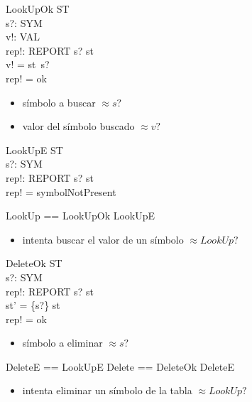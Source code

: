 \begin{schema}{LookUpOk}
\Xi ST \\
s?: SYM \\
v!: VAL \\
rep!: REPORT
\where
s? \in \dom st \\
v! = st~s? \\
rep! = ok
\end{schema}

\begin{itemize}
  \item símbolo a buscar $\approx s?$ \\
  \item valor del símbolo buscado  $\approx v?$ \\
\end{itemize}

\begin{schema}{LookUpE}
\Xi ST \\
s?: SYM \\
rep!: REPORT
\where
s? \notin \dom st \\
rep! = symbolNotPresent
\end{schema}

\begin{zed}
LookUp == LookUpOk \lor LookUpE
\end{zed}

\begin{itemize}
  \item intenta buscar el valor de un símbolo $\approx LookUp?$ \\
\end{itemize}

\begin{schema}{DeleteOk}
\Delta ST \\
s?: SYM \\
rep!: REPORT
\where
s? \in \dom st \\
st' = \{s?\} \ndres st \\
rep! = ok
\end{schema}

\begin{itemize}
  \item símbolo a eliminar $\approx s?$ \\
\end{itemize}

\begin{zed}
DeleteE == LookUpE \also
Delete == DeleteOk \lor DeleteE
\end{zed}

\begin{itemize}
  \item intenta eliminar un símbolo de la tabla $\approx LookUp?$ \\
\end{itemize}

